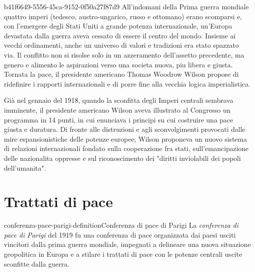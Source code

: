 \documentclass[preview]{standalone}
\begin{document}
\begin{snippet}{b41f6649-5556-45ca-9152-0f50a27f87d9}
    All'indomani della Prima guerra mondiale quattro imperi (tedesco, austro-ungarico, russo e
    ottomano) erano scomparsi e, con l'emergere degli Stati Uniti a grande potenza internazionale,
    un'Europa devastata dalla guerra aveva cessato di essere il centro del mondo. Insieme ai vecchi
    ordinamenti, anche un universo di valori e tradizioni era stato spazzato via. Il conflitto non si
    risolse solo in un azzeramento dell'assetto precedente, ma genero e alimento le aspirazioni
    verso una societa nuova, piu libera e giusta. Tornata la pace, il presidente americano Thomas
    Woodrow Wilson propose di ridefinire i rapporti internazionali e di porre fine alla vecchia
    logica imperialistica.
    
    Già nel gennaio del 1918, quando la sconfitta degli Imperi centrali sembrava imminente, il
    presidente americano Wilson aveva illustrato al Congresso un programma in 14 punti, in cui
    enunciava i principi su cui costruire una pace giusta e duratura. Di fronte alle distruzioni e agli
    sconvolgimenti provocati dalle mire espansionistiche delle potenze europee, Wilson proponeva
    un nuovo sistema di relazioni internazionali fondato sulla cooperazione fra stati,
    sull'emancipazione delle nazionalita oppresse e sul riconoscimento dei "diritti inviolabili dei
    popoli dell'umanita".
    
\end{snippet}

\section{Trattati di pace}

\begin{snippetdefinition}{conferenza-pace-parigi-definition}{Conferenza di pace di Parigi}
    La \textit{conferenza di pace di Parigi} del 1919 fu una conferenza di
    pace organizzata dai paesi usciti vincitori dalla prima guerra mondiale,
    impegnati a delineare una nuova situazione geopolitica in Europa e a
    stilare i trattati di pace con le potenze centrali uscite sconfitte dalla guerra. 
\end{snippetdefinition}


\end{document}
